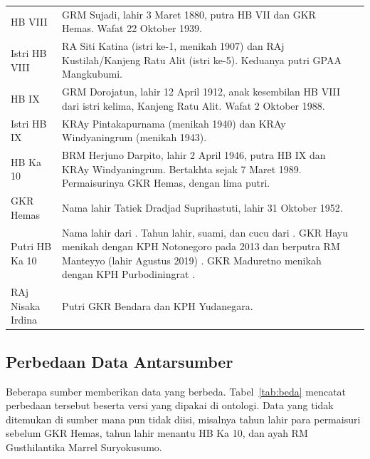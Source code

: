 \documentclass[11pt,a4paper]{article}
\begin{document}
\begin{longtable}{>{\raggedright\arraybackslash}p{3.2cm} >{\raggedright\arraybackslash}p{9.6cm} p{1.8cm}}
HB VIII & GRM Sujadi, lahir 3 Maret 1880, putra HB VII dan GKR Hemas. Wafat 22 Oktober 1939. & \cite{kj-hb8} \\
Istri HB VIII & RA Siti Katina (istri ke-1, menikah 1907) dan RAj Kustilah/Kanjeng Ratu Alit (istri ke-5).
Keduanya putri GPAA Mangkubumi. & \cite{kj-hb9,wiki-hb8,ra-y8} \\
HB IX & GRM Dorojatun, lahir 12 April 1912, anak kesembilan HB VIII dari istri kelima, Kanjeng Ratu Alit. Wafat 2 Oktober 1988. & \cite{kj-hb9} \\
Istri HB IX & KRAy Pintakapurnama (menikah 1940) dan KRAy Windyaningrum (menikah 1943). & \cite{wiki-hb9} \\
HB Ka 10 & BRM Herjuno Darpito, lahir 2 April 1946, putra HB IX dan KRAy Windyaningrum. Bertakhta sejak 7 Maret 1989.
Permaisurinya GKR Hemas, dengan lima putri. & \cite{kj-bertakhta} \\
GKR Hemas & Nama lahir Tatiek Dradjad Suprihastuti, lahir 31 Oktober 1952. & \cite{kj-hemas,wiki-hemas} \\
Putri HB Ka 10 & Nama lahir dari \cite{kj-bertakhta}. Tahun lahir, suami, dan cucu dari \cite{wiki-hb10}. GKR Hayu
menikah dengan KPH Notonegoro pada 2013 dan berputra RM Manteyyo (lahir Agustus 2019) \cite{kj-hayu}. GKR Maduretno
menikah dengan KPH Purbodiningrat \cite{kj-maduretno}. & \cite{kj-bertakhta,wiki-hb10,kj-hayu,kj-maduretno} \\
RAj Nisaka Irdina & Putri GKR Bendara dan KPH Yudanegara. & \cite{kj-nisaka} \\
\bottomrule
\end{longtable}

\subsection{Perbedaan Data Antarsumber}

Beberapa sumber memberikan data yang berbeda. Tabel~\ref{tab:beda} mencatat perbedaan tersebut beserta versi yang
dipakai di ontologi. Data yang tidak ditemukan di sumber mana pun tidak diisi, misalnya tahun lahir para permaisuri
sebelum GKR Hemas, tahun lahir menantu HB Ka 10, dan ayah RM Gusthilantika Marrel Suryokusumo.
\end{document}
